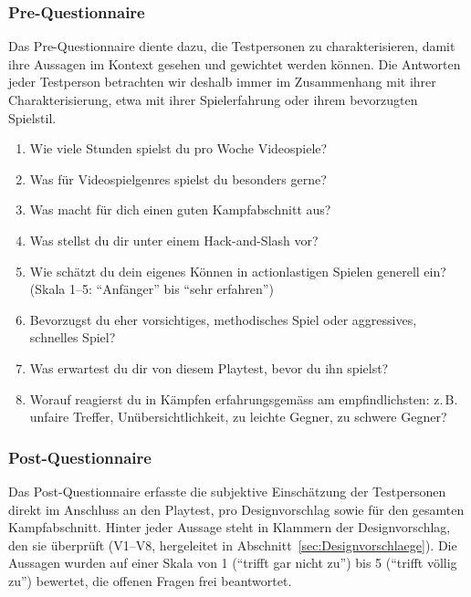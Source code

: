 \documentclass[../Main.tex]{subfiles}
\begin{document}
\subsubsection{Pre-Questionnaire} \label{sec:PreQuestionnaire}

Das Pre-Questionnaire diente dazu, die Testpersonen zu charakterisieren, damit ihre Aussagen im Kontext gesehen und gewichtet werden können. Die Antworten jeder Testperson betrachten wir deshalb immer im Zusammenhang mit ihrer Charakterisierung, etwa mit ihrer Spielerfahrung oder ihrem bevorzugten Spielstil.

\begin{enumerate}[label=\textbf{P\arabic*}, leftmargin=1.5cm, itemsep=0.5em]
    \item Wie viele Stunden spielst du pro Woche Videospiele?
    \item Was für Videospielgenres spielst du besonders gerne?
    \item Was macht für dich einen guten Kampfabschnitt aus?
    \item Was stellst du dir unter einem Hack-and-Slash vor?
    \item Wie schätzt du dein eigenes Können in actionlastigen Spielen generell ein? (Skala 1--5: \enquote{Anfänger} bis \enquote{sehr erfahren})
    \item Bevorzugst du eher vorsichtiges, methodisches Spiel oder aggressives, schnelles Spiel?
    \item Was erwartest du dir von diesem Playtest, bevor du ihn spielst?
    \item Worauf reagierst du in Kämpfen erfahrungsgemäss am empfindlichsten: z.\,B. unfaire Treffer, Unübersichtlichkeit, zu leichte Gegner, zu schwere Gegner?
\end{enumerate}

\subsubsection{Post-Questionnaire} \label{sec:PostQuestionnaire}

Das Post-Questionnaire erfasste die subjektive Einschätzung der Testpersonen direkt im Anschluss an den Playtest, pro Designvorschlag sowie für den gesamten Kampfabschnitt. Hinter jeder Aussage steht in Klammern der Designvorschlag, den sie überprüft (V1--V8, hergeleitet in Abschnitt~\ref{sec:Designvorschlaege}). Die Aussagen wurden auf einer Skala von 1 (\enquote{trifft gar nicht zu}) bis 5 (\enquote{trifft völlig zu}) bewertet, die offenen Fragen frei beantwortet.
\end{document}
